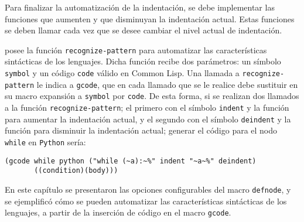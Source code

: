 Para finalizar la automatización de la indentación, se debe implementar las funciones que aumenten y que disminuyan la indentación actual. Estas funciones se deben llamar cada vez que se desee cambiar el nivel actual de indentación.

{\gagm} posee la función \texttt{recognize-pattern} para automatizar las características sintácticas de los lenguajes. Dicha función recibe dos parámetros: un símbolo \texttt{symbol} y un código \texttt{code} válido en Common Lisp. Una llamada a \texttt{recognize-pattern} le indica a \texttt{gcode}, que en cada llamado que se le realice debe sustituir en su macro expansión a \texttt{symbol} por \texttt{code}. De esta forma, si se realizan dos llamados a la función \texttt{recognize-pattern}; el primero con el símbolo \texttt{indent} y la función para aumentar la indentación actual, y el segundo con el símbolo \texttt{deindent} y la función para disminuir la indentación actual; generar el código para el nodo \texttt{while} en \texttt{Python} sería:     

\begin{verbatim}
(gcode while python ("while (~a):~%" indent "~a~%" deindent) 
       ((condition)(body))) 
\end{verbatim}


 En este capítulo se presentaron las opciones configurables del macro \texttt{defnode}, y se ejemplificó cómo se pueden automatizar las características sintácticas de los lenguajes, a partir de la inserción de código en el macro \texttt{gcode}.

